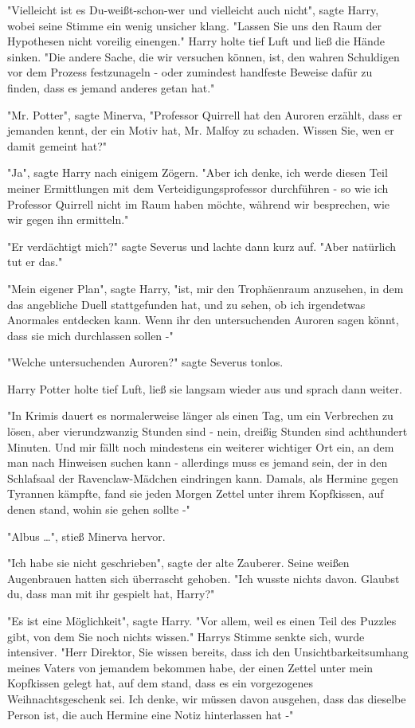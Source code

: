 {"Vielleicht ist es Du-weißt-schon-wer und vielleicht auch nicht", sagte Harry, wobei seine Stimme ein wenig unsicher klang. "Lassen Sie uns den Raum der Hypothesen nicht voreilig einengen." Harry holte tief Luft und ließ die Hände sinken. "Die andere Sache, die wir versuchen können, ist, den wahren Schuldigen vor dem Prozess festzunageln - oder zumindest handfeste Beweise dafür zu finden, dass es jemand anderes getan hat."

"Mr. Potter", sagte Minerva, "Professor Quirrell hat den Auroren erzählt, dass er jemanden kennt, der ein Motiv hat, Mr. Malfoy zu schaden. Wissen Sie, wen er damit gemeint hat?"

"Ja", sagte Harry nach einigem Zögern. "Aber ich denke, ich werde diesen Teil meiner Ermittlungen mit dem Verteidigungsprofessor durchführen - so wie ich Professor Quirrell nicht im Raum haben möchte, während wir besprechen, wie wir gegen ihn ermitteln."

"Er verdächtigt mich?" sagte Severus und lachte dann kurz auf. "Aber natürlich tut er das."

"Mein eigener Plan", sagte Harry, "ist, mir den Trophäenraum anzusehen, in dem das angebliche Duell stattgefunden hat, und zu sehen, ob ich irgendetwas Anormales entdecken kann. Wenn ihr den untersuchenden Auroren sagen könnt, dass sie mich durchlassen sollen -"

"Welche untersuchenden Auroren?" sagte Severus tonlos.

Harry Potter holte tief Luft, ließ sie langsam wieder aus und sprach dann weiter.

"In Krimis dauert es normalerweise länger als einen Tag, um ein Verbrechen zu lösen, aber vierundzwanzig Stunden sind - nein, dreißig Stunden sind achthundert Minuten. Und mir fällt noch mindestens ein weiterer wichtiger Ort ein, an dem man nach Hinweisen suchen kann - allerdings muss es jemand sein, der in den Schlafsaal der Ravenclaw-Mädchen eindringen kann. Damals, als Hermine gegen Tyrannen kämpfte, fand sie jeden Morgen Zettel unter ihrem Kopfkissen, auf denen stand, wohin sie gehen sollte -"

"Albus …", stieß Minerva hervor.

"Ich habe sie nicht geschrieben", sagte der alte Zauberer. Seine weißen Augenbrauen hatten sich überrascht gehoben. "Ich wusste nichts davon. Glaubst du, dass man mit ihr gespielt hat, Harry?"

"Es ist eine Möglichkeit", sagte Harry. "Vor allem, weil es einen Teil des Puzzles gibt, von dem Sie noch nichts wissen." Harrys Stimme senkte sich, wurde intensiver. "Herr Direktor, Sie wissen bereits, dass ich den Unsichtbarkeitsumhang meines Vaters von jemandem bekommen habe, der einen Zettel unter mein Kopfkissen gelegt hat, auf dem stand, dass es ein vorgezogenes Weihnachtsgeschenk sei. Ich denke, wir müssen davon ausgehen, dass das dieselbe Person ist, die auch Hermine eine Notiz hinterlassen hat -"

}
